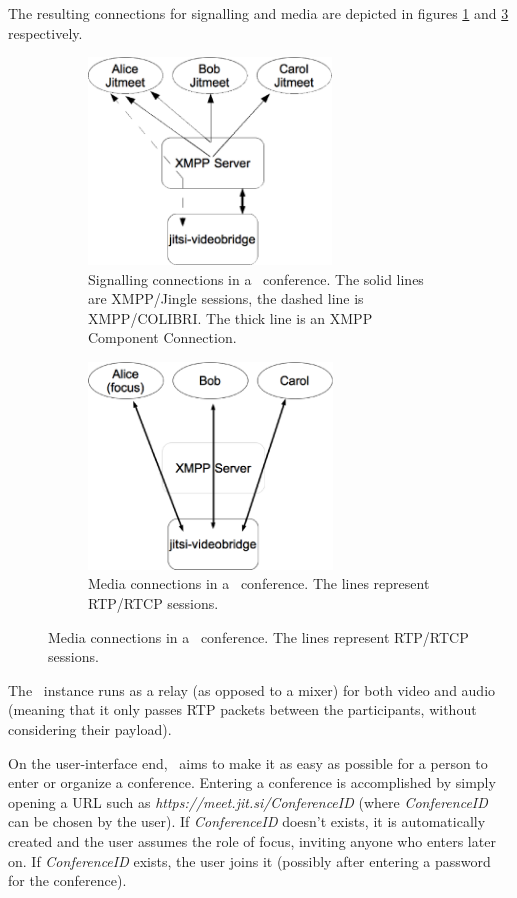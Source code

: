\documentclass[twoside,openright,a4paper,12pt,english]{article}
\begin{document}
The resulting connections for signalling and media are depicted in figures
\ref{jitmeet-sig} and \ref{jitmeet-med} respectively.


\begin{figure}[h]
   \centering
        \begin{subfigure}[t]{0.4\textwidth}
            \includegraphics[height=5.5cm]{./pics/jm-sig.eps}
            \caption{Signalling connections in a \jm\ conference.
                The solid lines are XMPP/Jingle sessions, the dashed line
                is XMPP/COLIBRI. The thick line is an XMPP Component Connection.}
            \label{jitmeet-sig}
        \end{subfigure}
        \quad
        \quad
        \quad
        \begin{subfigure}[t]{0.4\textwidth}
            \includegraphics[height=5.5cm]{./pics/jm-med.eps}
            \caption{Media connections in a \jm\ conference. The
                lines represent RTP/RTCP sessions.}
            \label{jitmeet-med}
        \end{subfigure}
\end{figure}

The \jvb\ instance runs as a relay (as opposed to a mixer) for both video and
audio (meaning that it only passes RTP packets between the participants,
without considering their payload).

\smallskip
On the user-interface end, \jm\ aims to make it as easy as possible for a
person to enter or organize a conference. 
Entering a conference is accomplished by simply opening a URL such as \emph{https://meet.jit.si/ConferenceID} 
(where \emph{ConferenceID} can be chosen by the user). If \emph{ConferenceID}
doesn't exists, it is automatically created and
the user assumes the role of focus, inviting anyone who enters later on. If
\emph{ConferenceID} exists,
the user joins it (possibly after entering a password for the conference).
\end{document}
